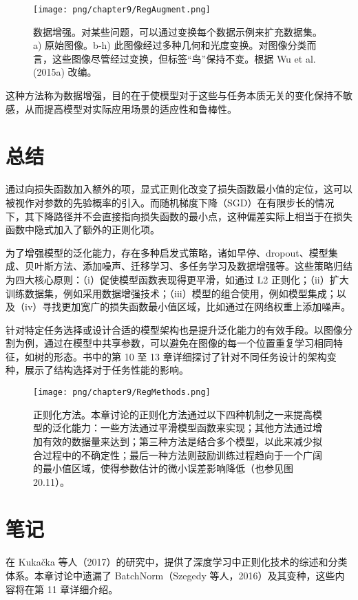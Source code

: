 \begin{figure}[ht!]
	\centering
	\texttt{[image: png/chapter9/RegAugment.png]}
	\caption{数据增强。对某些问题，可以通过变换每个数据示例来扩充数据集。a) 原始图像。b-h) 此图像经过多种几何和光度变换。对图像分类而言，这些图像尽管经过变换，但标签“鸟”保持不变。根据 Wu et al. (2015a) 改编。}
\end{figure}


这种方法称为数据增强，目的在于使模型对于这些与任务本质无关的变化保持不敏感，从而提高模型对实际应用场景的适应性和鲁棒性。

\section{总结}
通过向损失函数加入额外的项，显式正则化改变了损失函数最小值的定位，这可以被视作对参数的先验概率的引入。而随机梯度下降（SGD）在有限步长的情况下，其下降路径并不会直接指向损失函数的最小点，这种偏差实际上相当于在损失函数中隐式加入了额外的正则化项。

为了增强模型的泛化能力，存在多种启发式策略，诸如早停、dropout、模型集成、贝叶斯方法、添加噪声、迁移学习、多任务学习及数据增强等。这些策略归结为四大核心原则：（i）促使模型函数表现得更平滑，如通过 L2 正则化；（ii）扩大训练数据集，例如采用数据增强技术；（iii）模型的组合使用，例如模型集成；以及（iv）寻找更加宽广的损失函数最小值区域，比如通过在网络权重上添加噪声。

针对特定任务选择或设计合适的模型架构也是提升泛化能力的有效手段。以图像分割为例，通过在模型中共享参数，可以避免在图像的每一个位置重复学习相同特征，如树的形态。书中的第 10 至 13 章详细探讨了针对不同任务设计的架构变种，展示了结构选择对于任务性能的影响。

\begin{figure}[ht!]
	\centering
	\texttt{[image: png/chapter9/RegMethods.png]}
	\caption{正则化方法。本章讨论的正则化方法通过以下四种机制之一来提高模型的泛化能力：一些方法通过平滑模型函数来实现；其他方法通过增加有效的数据量来达到；第三种方法是结合多个模型，以此来减少拟合过程中的不确定性；最后一种方法则鼓励训练过程趋向于一个广阔的最小值区域，使得参数估计的微小误差影响降低（也参见图 20.11）。}
\end{figure}

\section{笔记}
在 Kukačka 等人（2017）的研究中，提供了深度学习中正则化技术的综述和分类体系。本章讨论中遗漏了 BatchNorm（Szegedy 等人，2016）及其变种，这些内容将在第 11 章详细介绍。

